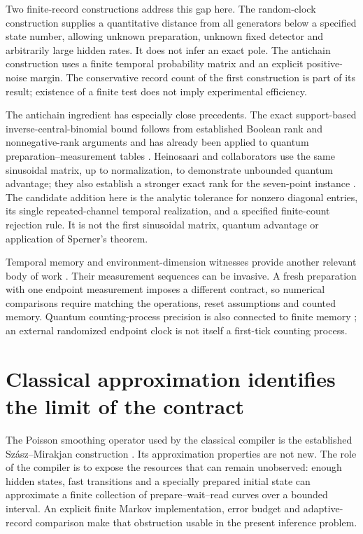 Two finite-record constructions address this gap here. The random-clock
construction supplies a quantitative distance from all generators below a
specified state number, allowing unknown preparation, unknown fixed detector
and arbitrarily large hidden rates. It does not infer an exact pole. The
antichain construction uses a finite temporal probability matrix and an
explicit positive-noise margin. The conservative record count of the first
construction is part of its result; existence of a finite test does not imply
experimental efficiency.

The antichain ingredient has especially close precedents. The exact
support-based inverse-central-binomial bound follows from established Boolean
rank and nonnegative-rank arguments \cite{rfDeCaen1981,rfGillis2020} and has
already been applied to quantum preparation--measurement tables
\cite{rfShahandeh2024}. Heinosaari and collaborators use the same sinusoidal
matrix, up to normalization, to demonstrate unbounded quantum advantage; they
also establish a stronger exact rank for the seven-point instance
\cite{rfHeinosaari2024}. The candidate addition here is the analytic tolerance
for nonzero diagonal entries, its single repeated-channel temporal realization,
and a specified finite-count rejection rule. It is not the first sinusoidal
matrix, quantum advantage or application of Sperner's theorem.

Temporal memory and environment-dimension witnesses provide another relevant
body of work \cite{rrVieira2022,rfVieira2024}. Their measurement sequences can
be invasive. A fresh preparation with one endpoint measurement imposes a
different contract, so numerical comparisons require matching the operations,
reset assumptions and counted memory. Quantum counting-process precision is
also connected to finite memory \cite{rfOlamaei2026}; an external randomized
endpoint clock is not itself a first-tick counting process.

\section{Classical approximation identifies the limit of the contract}

The Poisson smoothing operator used by the classical compiler is the
established Sz\'asz--Mirakjan construction \cite{rfSzasz1950}. Its approximation
properties are not new. The role of the compiler is to expose the resources
that can remain unobserved: enough hidden states, fast transitions and a
specially prepared initial state can approximate a finite collection of
prepare--wait--read curves over a bounded interval. An explicit finite Markov
implementation, error budget and adaptive-record comparison make that
obstruction usable in the present inference problem.

